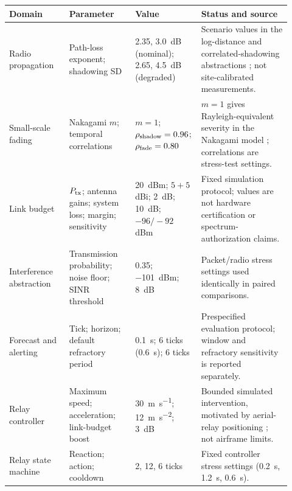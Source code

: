 \begin{tabular}{p{0.20\linewidth}p{0.22\linewidth}p{0.20\linewidth}p{0.30\linewidth}}
\toprule
Domain & Parameter & Value & Status and source \\
\midrule
Radio propagation & Path-loss exponent; shadowing SD & 2.35, \SI{3.0}{dB} (nominal); 2.65, \SI{4.5}{dB} (degraded) & Scenario values in the log-distance and correlated-shadowing abstractions \cite{goldsmith2005wireless,gudmundson1991correlation}; not site-calibrated measurements. \\
Small-scale fading & Nakagami $m$; temporal correlations & $m=1$; $\rho_{\rm shadow}=0.96$; $\rho_{\rm fade}=0.80$ & $m=1$ gives Rayleigh-equivalent severity in the Nakagami model \cite{nakagami1960mdistribution}; correlations are stress-test settings. \\
Link budget & $P_{\rm tx}$; antenna gains; system loss; margin; sensitivity & \SI{20}{dBm}; $5+5$ dBi; \SI{2}{dB}; \SI{10}{dB}; $-96/-92$ dBm & Fixed simulation protocol; values are not hardware certification or spectrum-authorization claims. \\
Interference abstraction & Transmission probability; noise floor; SINR threshold & 0.35; \SI{-101}{dBm}; \SI{8}{dB} & Packet/radio stress settings used identically in paired comparisons. \\
Forecast and alerting & Tick; horizon; default refractory period & \SI{0.1}{s}; 6 ticks (\SI{0.6}{s}); 6 ticks & Prespecified evaluation protocol; window and refractory sensitivity is reported separately. \\
Relay controller & Maximum speed; acceleration; link-budget boost & \SI{30}{m.s^{-1}}; \SI{12}{m.s^{-2}}; \SI{3}{dB} & Bounded simulated intervention, motivated by aerial-relay positioning \cite{yanmaz2022positioning}; not airframe limits. \\
Relay state machine & Reaction; action; cooldown & 2, 12, 6 ticks & Fixed controller stress settings (\SI{0.2}{s}, \SI{1.2}{s}, \SI{0.6}{s}). \\
\bottomrule
\end{tabular}
